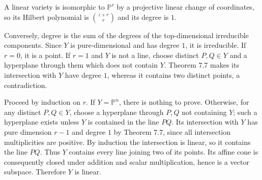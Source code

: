 A linear variety is isomorphic to $\mathbb{P}^r$ by a projective linear change of coordinates, so its Hilbert polynomial is $\binom{z+r}{r}$ and its degree is $1$.

Conversely, degree is the sum of the degrees of the top-dimensional irreducible components. Since $Y$ is pure-dimensional and has degree $1$, it is irreducible. If $r=0$, it is a point. If $r=1$ and $Y$ is not a line, choose distinct $P,Q\in Y$ and a hyperplane through them which does not contain $Y$. Theorem 7.7 makes its intersection with $Y$ have degree $1$, whereas it contains two distinct points, a contradiction.

Proceed by induction on $r$. If $Y=\mathbb{P}^n$, there is nothing to prove. Otherwise, for any distinct $P,Q\in Y$, choose a hyperplane through $P,Q$ not containing $Y$; such a hyperplane exists unless $Y$ is contained in the line $PQ$. Its intersection with $Y$ has pure dimension $r-1$ and degree $1$ by Theorem 7.7, since all intersection multiplicities are positive. By induction the intersection is linear, so it contains the line $PQ$. Thus $Y$ contains every line joining two of its points. Its affine cone is consequently closed under addition and scalar multiplication, hence is a vector subspace. Therefore $Y$ is linear.
